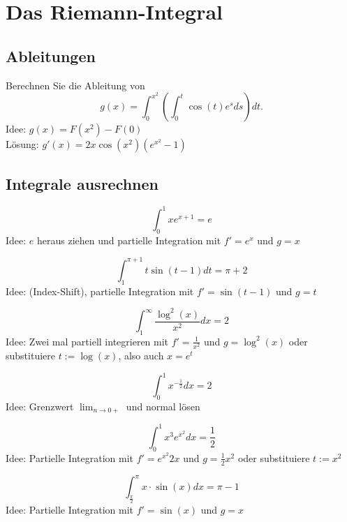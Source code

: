 \section{Das Riemann-Integral}

\subsection{Ableitungen}
Berechnen Sie die Ableitung von
\begin{displaymath}
  g(x) = \int_{0}^{x^2} \left(\int_{0}^{t} \cos(t)e^s ds\right)dt.
\end{displaymath}
Idee: $g(x) = F(x^2) - F(0)$\\
Lösung: $g'(x) = 2x \cos(x^2) \left(e^{x^2} - 1\right)$

\subsection{Integrale ausrechnen}
\begin{displaymath}
  \int_{0}^{1} xe^{x + 1} = e
\end{displaymath}
Idee: $e$ heraus ziehen und partielle Integration mit $f' = e^x$ und $g = x$

\begin{displaymath}            
  \int_{1}^{\pi + 1} t\sin(t - 1)dt = \pi + 2                                   
\end{displaymath}
Idee: (Index-Shift), partielle Integration mit $f' = \sin(t - 1)$ und $g = t$

\begin{displaymath}
  \int_{1}^{\infty} \frac{\log^2(x)}{x^2} dx = 2
\end{displaymath}
Idee: Zwei mal partiell integrieren mit $f' = \frac{1}{x^2}$ und $g = \log^2(x)$ oder substituiere $t := \log(x)$, also auch $x = e^t$

\begin{displaymath}
  \int_{0}^{1} x^{-\frac{1}{2}} dx = 2
\end{displaymath}
Idee: Grenzwert $\lim_{n \to 0+}$ und normal lösen

\begin{displaymath}
  \int_{0}^{1} x^3e^{x^2} dx = \frac{1}{2}
\end{displaymath}
Idee: Partielle Integration mit $f' = e^{x^2}2x$ und $g = \frac{1}{2}x^2$ oder substituiere $t := x^2$

\begin{displaymath}
  \int_{\frac{\pi}{2}}^{\pi} x \cdot \sin(x) dx = \pi - 1
\end{displaymath}
Idee: Partielle Integration mit $f' = \sin(x)$ und $g = x$


